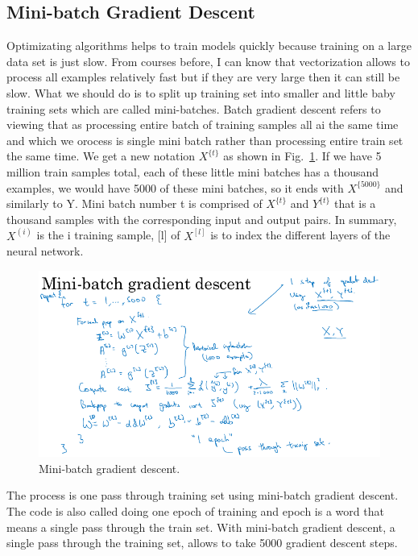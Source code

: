 \documentclass[a4paper]{article}
\begin{document}
\subsection{Mini-batch Gradient Descent}
Optimizating algorithms helps to train models quickly because training on a large data set is just slow. From courses before, I can know that vectorization allows to process all examples relatively fast but if they are very large then it can still be slow. What we should do is to split up training set into smaller and little baby training sets which are called mini-batches. Batch gradient descent refers to viewing that as processing entire batch of training samples all ai the same time and which we orocess is single mini batch rather than processing entire train set the same time. We get a new notation $X^{\{t\}}$ as shown in Fig.~\ref{p16}. If we have 5 million train samples total, each of these little mini batches has a thousand examples, we would have 5000 of these mini batches, so it ends with $X^{\{5000\}}$ and similarly to Y. Mini batch number t is comprised of $X^{\{t\}}$ and $Y^{\{t\}}$ that is a thousand samples with the corresponding input and output pairs. In summary, $X^{(i)}$ is the i training sample, [l] of $X^{[l]}$ is to index the different layers of the neural network. 
\begin{figure}
	\begin{center}
		\includegraphics[scale=0.5]{figures/17.png}
	\end{center}
	\caption{Mini-batch gradient descent.}
	\label{p16}
\end{figure}

The process is one pass through training set using mini-batch gradient descent. The code is also called doing one epoch of training and epoch is a word that means a single pass through the train set. With mini-batch gradient descent, a single pass through the training set, allows to take 5000 gradient descent steps.
\end{document}
